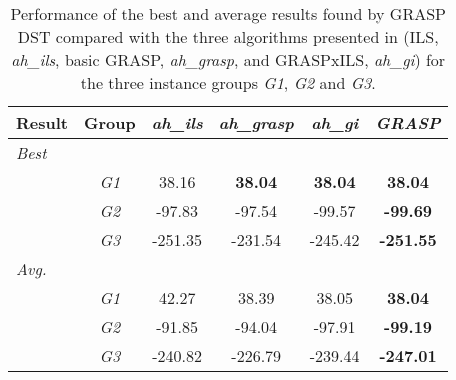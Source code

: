 \begin{table}[htbp!]
\centering
    \caption{Performance of the best and average results found by GRASP DST compared with the three algorithms presented in \cite{AitHaddadene2016} (ILS, \emph{ah\_ils}, basic GRASP,  \emph{ah\_grasp}, and GRASPxILS, \emph{ah\_gi}) for the three instance groups \emph{G1}, \emph{G2} and \emph{G3}.}
    \begin{tabular}{cccccc}
    \label{table:grouptableaithcombined}\\\hline

Result  &   Group   &   \emph{ah\_ils}  &   \emph{ah\_grasp}    &   \emph{ah\_gi}   &   \emph{GRASP}    \\  \hline
\multicolumn{6}{l}{\emph{Best}} \\                                              
    &   \emph{G1}   &   38.16   &   \textbf{38.04}  &   \textbf{38.04}  &   \textbf{38.04}  \\  
    &   \emph{G2}   &   -97.83  &   -97.54  &   -99.57  &   \textbf{-99.69} \\  
    &   \emph{G3}   &   -251.35 &   -231.54 &   -245.42 &   \textbf{-251.55}    \\  
\multicolumn{6}{l}{\emph{Avg.}} \\                                              
    &   \emph{G1}   &   42.27   &   38.39   &   38.05   &   \textbf{38.04}  \\  
    &   \emph{G2}   &   -91.85  &   -94.04  &   -97.91  &   \textbf{-99.19} \\  
    &   \emph{G3}   &   -240.82 &   -226.79 &   -239.44 &   \textbf{-247.01}    \\  
    \hline
    \end{tabular}
\end{table}